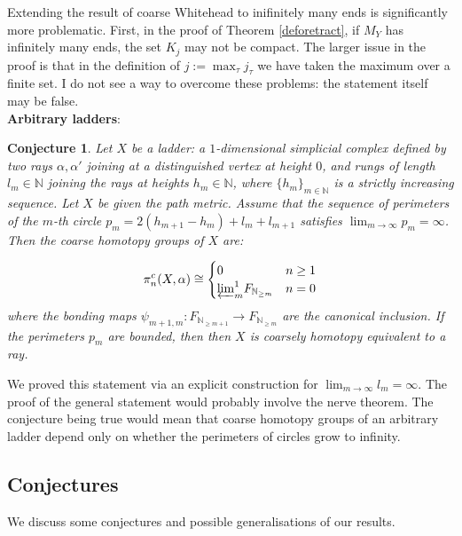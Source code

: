 \documentclass[a4paper,11pt]{article}
\theoremstyle{definition}
\theoremstyle{plain}
\newtheorem{conjecture}[definition]{Conjecture}
\theoremstyle{remark}
\begin{document}
{Extending the result of coarse Whitehead to inifinitely many ends is significantly more problematic. First, in the proof of Theorem \ref{deforetract}, if $M_{Y}$ has infinitely many ends, the set $K_{j}$ may not be compact. The larger issue in the proof is that in the definition of $j:= \max_{\tau} j_{\tau}$ we have taken the maximum over a finite set. I do not see a way to overcome these problems: the statement itself may be false. \\

\textbf{Arbitrary ladders}: 


\begin{conjecture} Let $X$ be a ladder: a $1$-dimensional simplicial complex defined by two rays $\alpha,\alpha'$ joining at a distinguished vertex at height $0$, and rungs of length $l_{m}\in \mathbb{N}$  joining the rays at heights $h_{m} \in \mathbb{N}$, where $\{h_{m}\}_{m\in \mathbb{N}}$ is a strictly increasing sequence. Let $X$ be given the path metric. Assume that the sequence of perimeters of the $m$-th circle $p_{m}=2(h_{m+1}-h_{m})+l_{m}+l_{m+1}$ satisfies $\lim_{m\rightarrow \infty} p_{m} = \infty$. Then the coarse homotopy groups of $X$ are:

\[ \pi_{n}^{c}(X,\alpha) \cong \begin{cases} 
       0 &n\geq 1  \\
        {\varprojlim}^1_{m}  F_{\mathbb{N}_{\geq m}} & n=0 \\ 
       \end{cases}
    \]
where the bonding maps $\psi_{m+1,m}: F_{\mathbb{N}_{\geq m+1}} \rightarrow F_{\mathbb{N}_{\geq m}}$ are the canonical inclusion. If the perimeters $p_{m}$ are bounded, then then $X$ is coarsely homotopy equivalent to a ray.
\end{conjecture}

We proved this statement via an explicit construction for $\lim_{m\rightarrow \infty} l_{m}= \infty$. The proof of the general statement would probably involve the nerve theorem. The conjecture being true would mean that coarse homotopy groups of an arbitrary ladder depend only on whether the perimeters of circles grow to infinity. 

\subsection{Conjectures}

We discuss some conjectures and possible generalisations of  our results.\\

}
\end{document}
